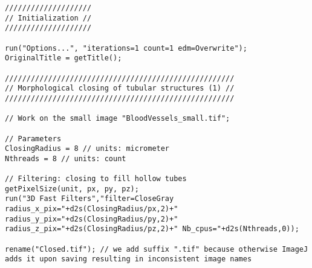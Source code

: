 \begin{lstlisting}
////////////////////
// Initialization //
////////////////////

run("Options...", "iterations=1 count=1 edm=Overwrite");
OriginalTitle = getTitle();

/////////////////////////////////////////////////////
// Morphological closing of tubular structures (1) //
/////////////////////////////////////////////////////

// Work on the small image "BloodVessels_small.tif";

// Parameters
ClosingRadius = 8 // units: micrometer
Nthreads = 8 // units: count

// Filtering: closing to fill hollow tubes
getPixelSize(unit, px, py, pz);
run("3D Fast Filters","filter=CloseGray radius_x_pix="+d2s(ClosingRadius/px,2)+" radius_y_pix="+d2s(ClosingRadius/py,2)+" radius_z_pix="+d2s(ClosingRadius/pz,2)+" Nb_cpus="+d2s(Nthreads,0));

rename("Closed.tif"); // we add suffix ".tif" because otherwise ImageJ adds it upon saving resulting in inconsistent image names

\end{lstlisting}